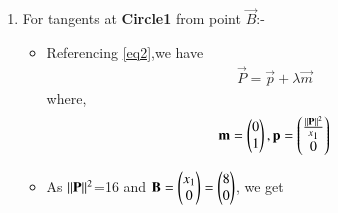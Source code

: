 \documentclass[journal,12pt,twocolumn]{IEEEtran}
\begin{document}
\begin{enumerate}
\begin{proof}
\begin{itemize}
  \begin{align}
    \implies   \myvec{x\textsubscript{1}&0}\vec{L} &=\norm{\vec{L}}^2 
    \\
    \implies   \myvec{1&0}\vec{L} &=\myvec{\frac{\norm{\vec{L}}^2}{x\textsubscript{1}}\\0} 
    \\
    \implies \vec{L}&=\myvec{\frac{\norm{\vec{L}}^2}{x\textsubscript{1}}\\0} +\lambda\myvec{0\\1}
  \\
    \implies \vec{L}&=\vec{l}+\lambda\vec{m} 
   \end{align}
    \begin{align}
   \text{where, }\vec{l}&=\myvec{\frac{\norm{\vec{L}}^2}{x\textsubscript{1}}\\0},\text{and }\vec{m}&=\myvec{0\\1}
   \end{align}
\item Also we know,
\begin{align}
\norm{\vec{l}+\lambda\vec{m}}^2&=\norm{\vec{L}}^2
\\
(\vec{l}+\lambda \vec{m})^T(\vec{l}+\lambda \vec{m})&=\norm{\vec{L}}^2
\end{align}
\begin{align}
\lambda^2&=\frac{\norm{\vec{L}}^2-\norm{\vec{l}}^2}{\norm{\vec{m}}^2}
\\
\lambda &= \pm \sqrt{\frac{\norm{\vec{L}}^2-\norm{\vec{l}}^2}{\norm{\vec{m}}^2}} 
\end{align}
\end{itemize}
\end{proof}
\item For tangents at \textbf{Circle1} from point $\vec{B}$:-
\begin{itemize}
\item Referencing \eqref{eq2},we have
\begin{align}
 \vec{P}=\vec{p}+\lambda \vec{m}   \label{eqa}
\end{align}
where,
\begin{align}
 \mathbf{m}=\begin{pmatrix}0\\1\end{pmatrix},\mathbf{p}=\begin{pmatrix}\frac{\lVert\mathbf{P}\rVert^2}{x\textsubscript{1}}\\0\end{pmatrix}
 \end{align}
 \item As $\lVert\mathbf{P}\rVert^2$=16 and $\mathbf{B}=\begin{pmatrix}x\textsubscript{1}\\0\end{pmatrix}=\begin{pmatrix}8\\0\end{pmatrix}$, we get 

\end{itemize}
\end{enumerate}
\end{document}

